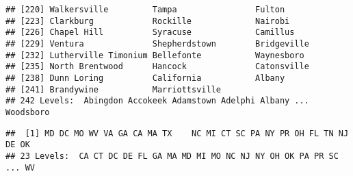 \documentclass[]{article}
\newenvironment{Shaded}{\begin{snugshade}}{\end{snugshade}}
\newcommand{\KeywordTok}[1]{\textcolor[rgb]{0.13,0.29,0.53}{\textbf{#1}}}
\newcommand{\OperatorTok}[1]{\textcolor[rgb]{0.81,0.36,0.00}{\textbf{#1}}}
\newcommand{\NormalTok}[1]{#1}
\begin{document}
\begin{verbatim}
## [220] Walkersville         Tampa                Fulton              
## [223] Clarkburg            Rockille             Nairobi             
## [226] Chapel Hill          Syracuse             Camillus            
## [229] Ventura              Shepherdstown        Bridgeville         
## [232] Lutherville Timonium Bellefonte           Waynesboro          
## [235] North Brentwood      Hancock              Catonsville         
## [238] Dunn Loring          California           Albany              
## [241] Brandywine           Marriottsville      
## 242 Levels:  Abingdon Accokeek Adamstown Adelphi Albany ... Woodsboro
\end{verbatim}

\begin{Shaded}
\end{Shaded}

\begin{verbatim}
##  [1] MD DC MO WV VA GA CA MA TX    NC MI CT SC PA NY PR OH FL TN NJ DE OK
## 23 Levels:  CA CT DC DE FL GA MA MD MI MO NC NJ NY OH OK PA PR SC ... WV
\end{verbatim}

\begin{Shaded}
\end{Shaded}
\end{document}
